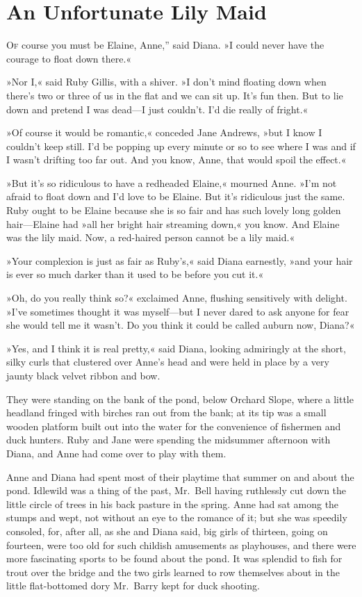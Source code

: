 \chapter{An Unfortunate Lily Maid}

\lettrine[ante=“,lines=4]{O}{f} course you must be Elaine, Anne,” said Diana. »I could never have the courage to float down there.«

»Nor I,« said Ruby Gillis, with a shiver. »I don't mind floating down when there's two or three of us in the flat and we can sit up. It's fun then. But to lie down and pretend I was dead—I just couldn't. I'd die really of fright.«

»Of course it would be romantic,« conceded Jane Andrews, »but I know I couldn't keep still. I'd be popping up every minute or so to see where I was and if I wasn't drifting too far out. And you know, Anne, that would spoil the effect.«

»But it's so ridiculous to have a redheaded Elaine,« mourned Anne. »I'm not afraid to float down and I'd love to be Elaine. But it's ridiculous just the same. Ruby ought to be Elaine because she is so fair and has such lovely long golden hair—Elaine had »all her bright hair streaming down,« you know. And Elaine was the lily maid. Now, a red-haired person cannot be a lily maid.«

»Your complexion is just as fair as Ruby's,« said Diana earnestly, »and your hair is ever so much darker than it used to be before you cut it.«

»Oh, do you really think so?« exclaimed Anne, flushing sensitively with delight. »I've sometimes thought it was myself—but I never dared to ask anyone for fear she would tell me it wasn't. Do you think it could be called auburn now, Diana?«

»Yes, and I think it is real pretty,« said Diana, looking admiringly at the short, silky curls that clustered over Anne's head and were held in place by a very jaunty black velvet ribbon and bow.

They were standing on the bank of the pond, below Orchard Slope, where a little headland fringed with birches ran out from the bank; at its tip was a small wooden platform built out into the water for the convenience of fishermen and duck hunters. Ruby and Jane were spending the midsummer afternoon with Diana, and Anne had come over to play with them.

Anne and Diana had spent most of their playtime that summer on and about the pond. Idlewild was a thing of the past, Mr.~Bell having ruthlessly cut down the little circle of trees in his back pasture in the spring. Anne had sat among the stumps and wept, not without an eye to the romance of it; but she was speedily consoled, for, after all, as she and Diana said, big girls of thirteen, going on fourteen, were too old for such childish amusements as playhouses, and there were more fascinating sports to be found about the pond. It was splendid to fish for trout over the bridge and the two girls learned to row themselves about in the little flat-bottomed dory Mr.~Barry kept for duck shooting.

